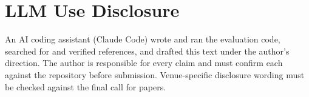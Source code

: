 \documentclass[11pt]{article}
\begin{document}
\section*{LLM Use Disclosure}
An AI coding assistant (Claude Code) wrote and ran the evaluation code, searched for and verified references, and drafted this text under the author's direction. The author is responsible for every claim and must confirm each against the repository before submission. Venue-specific disclosure wording must be checked against the final call for papers.



\end{document}

